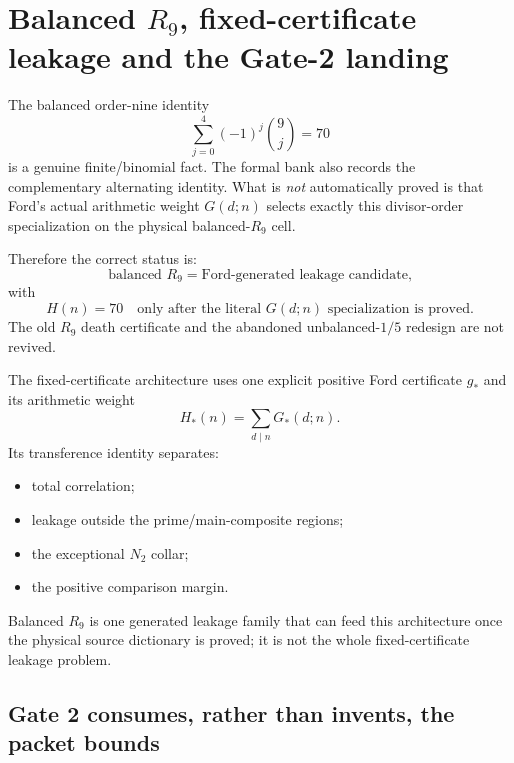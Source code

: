 \documentclass[11pt]{article}
\theoremstyle{definition}
\newcommand{\1}{\mathbf 1}
\begin{document}
\section{Balanced $R_9$, fixed-certificate leakage and the Gate-2 landing}
\label{sec:r9-fcl}

The balanced order-nine identity
\[
\sum_{j=0}^{4}(-1)^j\binom9j=70
\]
is a genuine finite/binomial fact.  The formal bank also records the complementary
alternating identity.  What is \emph{not} automatically proved is that Ford's actual
arithmetic weight $G(d;n)$ selects exactly this divisor-order specialization on the physical
balanced-$R_9$ cell.

Therefore the correct status is:
\[
\boxed{
\text{balanced }R_9
=
\text{Ford-generated leakage candidate,}
}
\]
with
\[
\boxed{
H(n)=70
\quad\text{only after the literal }G(d;n)\text{ specialization is proved.}
}
\]
The old $R_9$ death certificate and the abandoned unbalanced-$1/5$ redesign are not
revived.

The fixed-certificate architecture uses one explicit positive Ford certificate $g_\ast$
and its arithmetic weight
\[
H_\ast(n)=\sum_{d\mid n}G_\ast(d;n).
\]
Its transference identity separates:
\begin{itemize}[leftmargin=1.6em]
\item total correlation;
\item leakage outside the prime/main-composite regions;
\item the exceptional $N_2$ collar;
\item the positive comparison margin.
\end{itemize}
Balanced $R_9$ is one generated leakage family that can feed this architecture once the
physical source dictionary is proved; it is not the whole fixed-certificate leakage
problem.

\subsection{Gate 2 consumes, rather than invents, the packet bounds}
\end{document}

